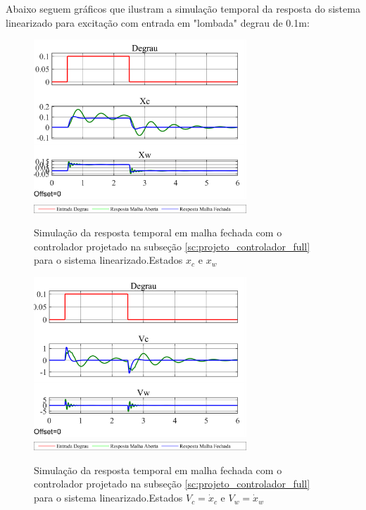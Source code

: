 \documentclass[a4paper]{ifacconf}
\begin{document}
    Abaixo seguem gráficos que ilustram a simulação temporal da resposta do sistema linearizado para excitação com entrada em "lombada" degrau de 0.1m:
    \FloatBarrier
    \begin{figure}[htbp]
        \begin{centering}
            \includegraphics[width=8cm]{img/simulaca_temporal_linear_realimentacao.png}
            \includegraphics[width=8cm]{img/sim_linear_simulink_temp_leg.png}
            \caption{Simulação da resposta temporal em malha fechada com o controlador projetado na subseção \ref{sc:projeto_controlador_full} para o sistema linearizado.Estados $x_c$ e $x_w$ }
            \label{fig:simulaca_temporal_linear_realimentacao}
        \end{centering}
    \end{figure}
    \FloatBarrier
	
	\FloatBarrier
    \begin{figure}[htbp]
        \begin{centering}
            \includegraphics[width=8cm]{img/simulaca_temporal_linear_realimentacao_V.png}
            \includegraphics[width=8cm]{img/sim_linear_simulink_temp_leg.png}
            \caption{Simulação da resposta temporal em malha fechada com o controlador projetado na subseção \ref{sc:projeto_controlador_full} para o sistema linearizado.Estados $V_c = \dot{x}_c$ e $V_w = \dot{x}_w$ }
            \label{fig:simulaca_temporal_linear_realimentacao_V}
        \end{centering}
    \end{figure}
    \FloatBarrier
    
\end{document}
